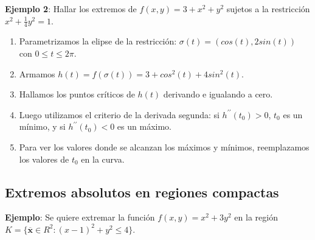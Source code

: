 \documentclass[a4paper, twoside]{article}
\numberwithin{equation}{section}
\numberwithin{figure}{section}
\numberwithin{table}{section}
\newcommand{\vect}[1]{\overline{\textbf{#1}}}
\begin{document}
\textbf{Ejemplo 2}: Hallar los extremos de $f(x,y)=3+x^2+y^2$ sujetos a la restricción $x^2+\frac{1}{4}y^2=1$.\\

\begin{enumerate}
	\item Parametrizamos la elipse de la restricción: $\sigma(t)=(cos(t),2sin(t))$ con $0\le t\le2\pi$.
	\item Armamos $h(t)=f(\sigma(t))=3+cos^2(t)+4sin^2(t)$.
	\item Hallamos los puntos críticos de $h(t)$ derivando e igualando a cero.
	\item Luego utilizamos el criterio de la derivada segunda: si $h^{\prime\prime} (t_0)>0$, $t_0$ es un mínimo, y si $h^{\prime\prime}(t_0)<0$ es un máximo.
	\item Para ver los valores donde se alcanzan los máximos y mínimos, reemplazamos los valores de $t_0$ en la curva.\\
\end{enumerate}

\subsection{Extremos absolutos en regiones compactas}

\textbf{Ejemplo}: Se quiere extremar la función $f(x,y)=x^{2}+3y^{2}$ en la región $K=\{\vect{x}\in R^2:(x-1)^2+y^2 \leq4\}$.\\
\end{document}
